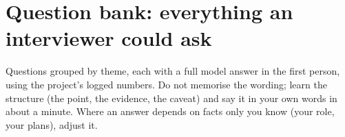 \documentclass[10.5pt,a4paper]{article}
\begin{document}
\clearpage
\section{Question bank: everything an interviewer could ask}
Questions grouped by theme, each with a full model answer in the first person, using the project's logged numbers.
Do not memorise the wording; learn the structure (the point, the evidence, the caveat) and say it in your own words in
about a minute. Where an answer depends on facts only you know (your role, your plans), adjust it.

\newcommand{\Q}[2]{\item \textbf{#1}\par\nobreak\vspace{1pt}#2}
\newenvironment{qlist}{\begin{enumerate}[leftmargin=*,itemsep=7pt,label=\arabic*.,resume=qb]}{\end{enumerate}}
\end{document}
